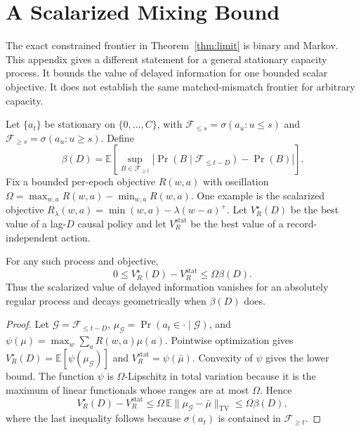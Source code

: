 \section{A Scalarized Mixing Bound}
\label{app:beta}
The exact constrained frontier in Theorem~\ref{thm:limit} is binary and Markov.
This appendix gives a different statement for a general stationary capacity
process. It bounds the value of delayed information for one bounded scalar
objective. It does not establish the same matched-mismatch frontier for arbitrary
capacity.

Let $\{a_t\}$ be stationary on $\{0,\dots,C\}$, with
$\mathcal F_{\le s}=\sigma(a_u:u\le s)$ and
$\mathcal F_{\ge s}=\sigma(a_u:u\ge s)$. Define
\begin{equation}\label{eq:beta}
\beta(D)=\mathbb E\!\left[
\sup_{B\in\mathcal F_{\ge t}}
\left|\Pr(B\mid\mathcal F_{\le t-D})-\Pr(B)\right|
\right].
\end{equation}
Fix a bounded per-epoch objective $R(w,a)$ with oscillation
$\Omega=\max_{w,a}R(w,a)-\min_{w,a}R(w,a)$. One example is the scalarized
objective $R_\lambda(w,a)=\min(w,a)-\lambda(w-a)^+$. Let $V_R^\star(D)$ be the
best value of a lag-$D$ causal policy and let $V_R^{\mathrm{stat}}$ be the best
value of a record-independent action.

\begin{theorem}\label{thm:beta}
For any such process and objective,
\begin{equation}\label{eq:betabound}
0\le V_R^\star(D)-V_R^{\mathrm{stat}}\le\Omega\beta(D).
\end{equation}
Thus the scalarized value of delayed information vanishes for an absolutely
regular process and decays geometrically when $\beta(D)$ does.
\end{theorem}
\begin{proof}
Let $\mathcal G=\mathcal F_{\le t-D}$,
$\mu_{\mathcal G}=\Pr(a_t\in\cdot\mid\mathcal G)$, and
$\psi(\mu)=\max_w\sum_a R(w,a)\mu(a)$. Pointwise optimization gives
$V_R^\star(D)=\mathbb E[\psi(\mu_{\mathcal G})]$ and
$V_R^{\mathrm{stat}}=\psi(\bar\mu)$. Convexity of $\psi$ gives the lower bound.
The function $\psi$ is $\Omega$-Lipschitz in total variation because it is the
maximum of linear functionals whose ranges are at most $\Omega$. Hence
\[
V_R^\star(D)-V_R^{\mathrm{stat}}
\le \Omega\,\mathbb E\|\mu_{\mathcal G}-\bar\mu\|_{\mathrm{TV}}
\le \Omega\beta(D),
\]
where the last inequality follows because $\sigma(a_t)$ is contained in
$\mathcal F_{\ge t}$.
\end{proof}

